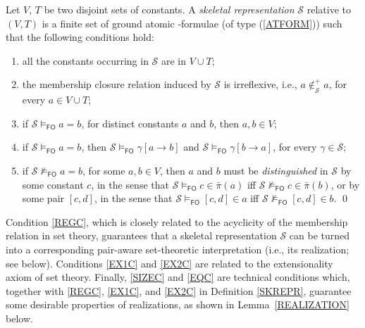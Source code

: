 \documentclass[a4paper]{llncs}
\newcommand{\nonpairssym}{\bar{\pi}}
\newcommand{\nonpairs}[1]{\nonpairssym(#1)}
\newcommand{\memclosure}[1]{\in_{#1}^{+}}
\newcommand{\pairin}[3]{\left[#1,#2\right] \in #3}
\newcommand{\seteq}[2]{#1=#2}
\newcommand{\atset}{\mathcal{S}}
\newcommand{\consta}{a}
\newcommand{\constb}{b}
\newcommand{\constc}{c}
\newcommand{\constd}{d}
\newcommand{\subst}[3]{#1[#2\rightarrow#3]}
\newcommand{\fomodels}[2]{#1 \models_{\mathsf{FO}} #2}
\newcommand{\notfomodels}[2]{#1 \not\models_{\mathsf{FO}} #2}
\begin{document}
\begin{definition}\label{SKREPR}
Let $V$, $T$ be
two disjoint sets of constants. A \emph{skeletal
representation} $\atset$ relative to $(V,T)$ is a finite set of ground atomic
\Forallpizero-formulae (of type (\ref{ATFORM})) such that the 
following conditions hold:
\begin{enumerate}[label=\textrm{(S\arabic*)},leftmargin=.9cm]
    \item\label{SIZEC} all the constants occurring in $\atset$ are in 
$V \cup T$;
    \item\label{REGC} the membership closure relation induced by $\atset$ is
    irreflexive, i.e.,  $\consta \not \memclosure{\atset} \consta$, for every
   $\consta \in V \cup T$;

   \item\label{EQC} if $\fomodels{\atset}{\seteq{\consta}{\constb}}$, 
for distinct constants $a$ and $b$, then $a,b \in V$;

   \item\label{EX1C} if $\fomodels{\atset}{\seteq{\consta}{\constb}}$, then
   $\fomodels{\atset}{\subst{\gamma}{\consta}{\constb}}$ and 
$\fomodels{\atset}{\subst{\gamma}{\constb}{\consta}}$, for every 
$\gamma \in \atset$;

   \item\label{EX2C} if 
$\notfomodels{\atset}{\seteq{\consta}{\constb}}$, for some $\consta, 
\constb \in V$,
   then $\consta$ and $\constb$ must be \emph{distinguished}
   in $\atset$ by some constant $\constc$, in the sense that 
$\fomodels{\atset}{\constc \in \nonpairs{\consta}}$
   iff $\notfomodels{\atset}{\constc \in \nonpairs{\constb}}$,
   or by some pair $[\constc, \constd]$, in the sense that 
$\fomodels{\atset}{\pairin{\constc}{\constd}{\consta}}$
   iff $\notfomodels{\atset}{\pairin{\constc}{\constd}{\constb}}$.  \qed
\end{enumerate}
\end{definition}
%
Condition \ref{REGC}, which is closely related to the acyclicity of 
the membership relation in set theory, guarantees that a skeletal 
representation
$\atset$ can be turned into a corresponding pair-aware set-theoretic
interpretation (i.e., its realization; see below).
%
Conditions \ref{EX1C} and \ref{EX2C} are related to the 
extensionality axiom of set theory.
%
Finally, \ref{SIZEC} and \ref{EQC} are technical conditions which,
together with \ref{REGC}, \ref{EX1C}, and \ref{EX2C} in Definition 
\ref{SKREPR}, guarantee some desirable properties of realizations, as 
shown in Lemma~\ref{REALIZATION} below.
\end{document}

